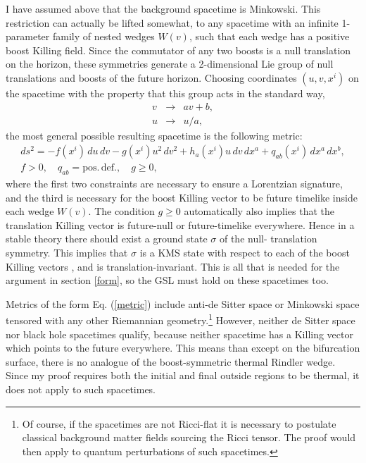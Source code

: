 \documentclass[12pt]{article}
\begin{document}
I have assumed above that the background spacetime is Minkowski.  This restriction can actually be lifted somewhat, to any spacetime with an infinite 1-parameter family of nested wedges 
$W(v)$, such that each wedge has a positive boost Killing field.  Since the commutator of any two boosts is a null translation on the horizon, these symmetries generate a 2-dimensional Lie group of null translations and boosts of the future horizon.  Choosing coordinates $(u, v, x^i)$ on the spacetime with the property that this group acts in the standard way,
\begin{eqnarray}
v &\to& av + b, \\
u &\to& u/a,
\end{eqnarray}
the most general possible resulting spacetime is the following metric:
\begin{eqnarray}\label{metric}
& ds^2 = - f(x^i)\,du\,dv - g(x^i) u^2\,dv^2 + 
h_a(x^i) u\,dv\,dx^a + q_{ab} (x^i) \,dx^a \,dx^b, &\\
& f > 0, \quad q_{ab} = \mathrm{pos.\,def.}, \quad g \ge 0, &
\end{eqnarray}
where the first two constraints are necessary to ensure a Lorentzian signature, and the third is necessary for the boost Killing vector to be future timelike inside each wedge $W(v)$.  The condition $g \ge 0$ automatically also implies that the translation Killing vector is future-null or future-timelike everywhere.  Hence in a stable theory there should exist a ground state $\sigma$ of the null- translation symmetry.  This implies that $\sigma$ is a KMS state with respect to each of the boost Killing vectors \cite{sewell81}, and is translation-invariant.  This is all that is needed for the argument in section \ref{form}, so the GSL must hold on these spacetimes too.

Metrics of the form Eq. (\ref{metric}) include anti-de Sitter space or Minkowski space tensored with any other Riemannian geometry.\footnote{Of course, if the spacetimes are not Ricci-flat it is necessary to postulate classical background matter fields sourcing the Ricci tensor.  The proof would then apply to quantum perturbations of such spacetimes.}  However, neither de Sitter space nor black hole spacetimes qualify, because neither spacetime has a Killing vector which points to the future everywhere.  This means than except on the bifurcation surface, there is no analogue of the boost-symmetric thermal Rindler wedge.  Since my proof requires both the initial and final outside regions to be thermal, it does not apply to such spacetimes.
\end{document}

